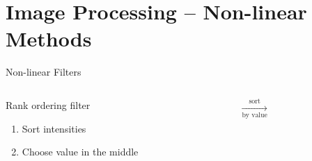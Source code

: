 \section{Image Processing -- Non-linear Methods}%

\begin{frame}[t]{Non-linear Filters}
    \begin{columns}[T, onlytextwidth]
        \begin{column}{0.4\textwidth}
            {}

            Rank ordering filter\bigskip
            \begin{enumerate}
                \item Sort intensities
                \item Choose value in the middle
            \end{enumerate}
        \end{column}%
        \begin{column}{0.5\textwidth}
            \quad%
            $\xrightarrow[\text{by value}]{\text{sort}}$\quad%
            \quad%

\end{column}
\end{columns}
\end{frame}

